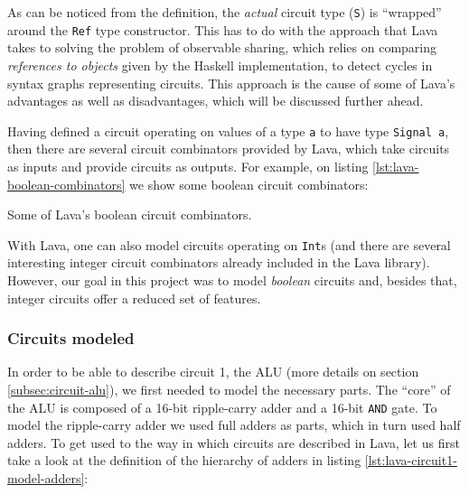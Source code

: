         As can be noticed from the definition, the \emph{actual} circuit type (\texttt{S}) is
        ``wrapped'' around the \texttt{Ref} type constructor. This has to do with the approach that
        Lava takes to solving the problem of observable sharing, which relies on comparing
        \emph{references to objects} given by the Haskell implementation, to detect cycles in syntax
        graphs representing circuits. This approach is the cause of some of Lava's advantages as
        well as disadvantages, which will be discussed further ahead.

        Having defined a circuit operating on values of a type \texttt{a} to have type
        \texttt{Signal a}, then there are several circuit combinators provided by Lava, which take
        circuits as inputs and provide circuits as outputs. For example, on listing
        \ref{lst:lava-boolean-combinators} we show some boolean circuit combinators:

        \begin{listing}[h!]
            \caption{Some of Lava's boolean circuit combinators.
                \label{lst:lava-boolean-combinators}}
        \end{listing}

        With Lava, one can also model circuits operating on \texttt{Int}s (and there are several
        interesting integer circuit combinators already included in the Lava library). However, our
        goal in this project was to model \emph{boolean} circuits and, besides that, integer
        circuits offer a reduced set of features.


        \subsubsection{Circuits modeled}
        \label{subsubsec:lava-circuits}

            In order to be able to describe circuit 1, the ALU (more details on section
            \ref{subsec:circuit-alu}), we first needed to model the necessary parts. The ``core'' of
            the ALU is composed of a 16-bit ripple-carry adder and a 16-bit \texttt{AND} gate. To
            model the ripple-carry adder we used full adders as parts, which in turn used half
            adders. To get used to the way in which circuits are described in Lava, let us first
            take a look at the definition of the hierarchy of adders in listing
            \ref{lst:lava-circuit1-model-adders}:

